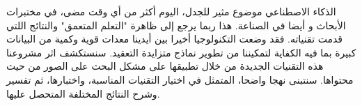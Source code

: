 \begin{RLtext}
الذكاء الاصطناعي موضوع مثير للجدل، اليوم أكثر من أي وقت مضى، في مختبرات الأبحاث و أيضا في الصناعة. هذا ربما يرجع إلى ظاهرة "التعلم المتعمق" والنتائج اللتي قدمت تقنياته. فقد وضعت التكنولوجيا أخيرا بين أيدينا معدات قوية وكمية من البيانات كبيرة بما فيه الكفاية لتمكيننا من تطوير نماذج متزايدة التعقيد. سنستكشف اثر مشروعنا هذه التقنيات الجديدة من خلال تطبيقها على مشكل البحث على الصور من حيث محتواها.
 سنتبنى نهجا واضحا، المتمثل في اختيار التقنيات المناسبة، واختبارها، ثم تفسير وشرح النتائج المختلفة المتحصل عليها.
\end{RLtext}